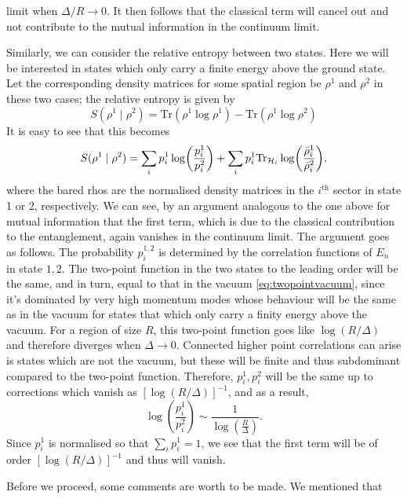 limit when $\Delta/R\rightarrow 0$. It then follows that the classical term
will cancel out and not contribute to the mutual information in the continuum
limit.
\par Similarly, we can consider the relative entropy between two states. Here
we will be interested in states  which only carry a finite energy above the
ground state. Let the corresponding density matrices for some spatial
region be $\rho^1$ and $\rho^2$ in these two cases; the relative entropy is
given by 
\begin{equation}
  S(\rho^1\mid\rho^2) = \mathrm{Tr}\left(\rho^1\log\rho^1\right)
  - \mathrm{Tr}\left(\rho^1\log\rho^2\right)
\end{equation}
It is easy to see that this becomes
\begin{equation}
  S(\rho^1\mid \rho^2) = \sum_i p^1_i\log(\frac{p_i^1}{p^2_i}) + \sum_i
  p_i^1\mathrm{Tr}_{\mathcal{H}_i}\log(\frac{\bar{\rho}^1_i}{\bar{\rho}_i^2}),
\end{equation}
where the bared rhos are the normalised density matrices in the
$i^{\mathrm{th}}$ sector in state 1 or 2, respectively. We can see, by
an argument analogous to the one above for mutual information that the first
term, which is due to the classical contribution to the entanglement, again
vanishes in the continuum limit. The argument goes as follows. The probability
$p_i^{1,2}$ is determined by the correlation functions of $E_n$ in state $1,2$.
The two-point function in the two states to the leading order will be the same,
and in turn, equal to that in the vacuum \eqref{eq:twopointvacuum}, since it's
dominated by very high momentum modes whose behaviour will be the same as in
the vacuum for states that which only carry a finity energy above the vacuum.
For a region of size $R$, this two-point function goes like $\log(R/\Delta)$
and therefore diverges when $\Delta\rightarrow 0$. Connected higher point
correlations can arise is states which are not the vacuum, but these will
be finite and thus subdominant compared to the two-point function. Therefore,
$p^1_i, p^2_i$ will be the same up to corrections which vanish as
$\left[\log(R/\Delta)\right]^{-1}$, and as a result,
\begin{equation}
  \log\left(\frac{p_i^1}{p_i^2}\right)\sim \frac{1}{\log(\frac{R}{\Delta})}.
\end{equation}
Since $p_i^1$ is normalised so that $\sum_i p_i^1 = 1$, we see that the first
term will be of order $\left[\log(R/\Delta)\right]^{-1}$ and thus will vanish.
\par Before we proceed, some comments are worth to be made. We mentioned that
